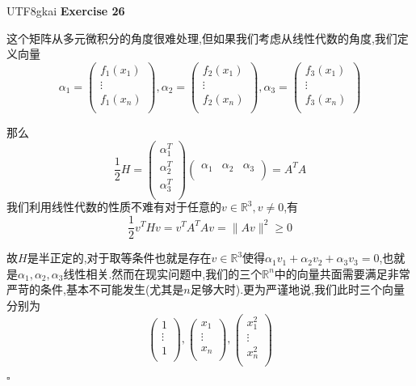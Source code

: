 \documentclass[11pt,hyperref,a4paper,UTF8]{ctexart}
\newenvironment{exercise}[1]{%
{\textbf{Exercise #1} \\ 
    }
}{
  \hfill $\square$ 
  \par\bigskip 
}
\newcommand{\RR}{\mathbb{R}}
\begin{document}
\begin{CJK}{UTF8}{gkai}
\begin{exercise}{26}
    这个矩阵从多元微积分的角度很难处理,但如果我们考虑从线性代数的角度,我们定义向量
    \[\alpha_1 = \begin{pmatrix}
        f_1(x_1)\\
        \vdots\\
        f_1(x_n)\\
    \end{pmatrix},\alpha_2 = \begin{pmatrix}
        f_2(x_1)\\
        \vdots\\
        f_2(x_n)\\
    \end{pmatrix},\alpha_3 = \begin{pmatrix}
        f_3(x_1)\\
        \vdots\\
        f_3(x_n)\\
    \end{pmatrix}\]

    那么
    \[\frac{1}{2} H = \begin{pmatrix}
        \alpha_1^T\\
        \alpha_2^T\\
        \alpha_3^T\\
    \end{pmatrix}
    \begin{pmatrix}
        \alpha_1&\alpha_2&\alpha_3\\
    \end{pmatrix} = A^T A\]
    我们利用线性代数的性质不难有对于任意的$v \in \RR^3,v \neq 0$,有
    \[\frac{1}{2} v^T H v = v^T A^T A v = \|A v\|^2 \geq 0\]
    
    故$H$是半正定的,对于取等条件也就是存在$v \in \RR^3$使得$\alpha_1 v_1 + \alpha_2 v_2 + \alpha_3 v_3 = 0$,也就是$\alpha_1,\alpha_2,\alpha_3$线性相关.然而在现实问题中,我们的三个$\RR^n$中的向量共面需要满足非常严苛的条件,基本不可能发生(尤其是$n$足够大时).更为严谨地说,我们此时三个向量分别为
    \[\begin{pmatrix}
        1\\
        \vdots\\
        1\\
    \end{pmatrix},\begin{pmatrix}
        x_1\\
        \vdots\\
        x_n\\
    \end{pmatrix},\begin{pmatrix}
        x_1^2\\
        \vdots\\
        x_n^2\\
    \end{pmatrix}\]
    

\end{exercise}
\end{CJK}
\end{document}
